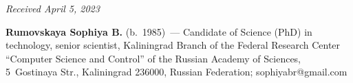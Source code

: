 \begin{multicols}{2}
{{ }
 }

\end{multicols}

\vspace*{-6pt}

\hfill{\small\textit{Received April 5, 2023}} 
      
   
   \Contrl
   
   \noindent
   \textbf{Rumovskaya Sophiya B.} (b.\ 1985)~--- Candidate of Science (PhD) in technology, senior 
scientist, Kaliningrad Branch of the Federal Research Center ``Computer Science and Control'' of the 
Russian Academy of Sciences, 5~Gostinaya Str., Kaliningrad 236000, Russian Federation; 
\mbox{sophiyabr@gmail.com}
    
\label{end\stat}

\renewcommand{\bibname}{\protect\rm Литература} 
    
